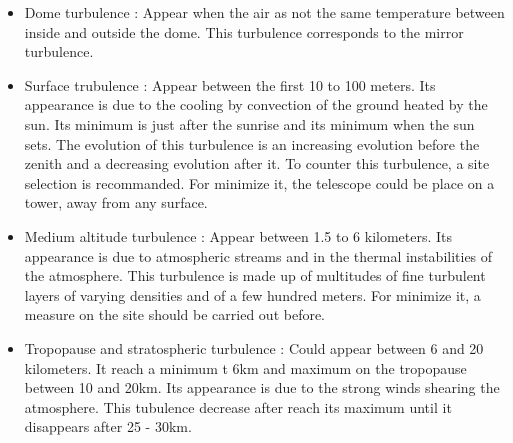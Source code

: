 \begin{itemize}
    \item Dome turbulence : \newline Appear when the air as not the same temperature between inside and outside the dome. This turbulence corresponds to
          the mirror turbulence.
    \item Surface trubulence : \newline Appear between the first 10 to 100 meters. Its appearance is due to the cooling by convection of the ground
          heated by the sun. Its minimum is just after the sunrise and its minimum when the sun sets. The evolution of this turbulence is an increasing
          evolution before the zenith and a decreasing evolution after it.\newline
          To counter this turbulence, a site selection is recommanded. For minimize it, the telescope could be place on a tower, away from any surface.
    \item Medium altitude turbulence : \newline Appear between 1.5 to 6 kilometers. Its appearance is due to atmospheric streams and in the thermal
          instabilities of the atmosphere. This turbulence is made up of multitudes of fine turbulent layers of varying densities and of a few hundred
          meters. For minimize it, a measure on the site should be carried out before.
    \item Tropopause and stratospheric turbulence : \newline Could appear between 6 and 20 kilometers. It reach a minimum t 6km and maximum on the
          tropopause between 10 and 20km. Its appearance is due to the strong winds shearing the atmosphere. This tubulence decrease after reach its maximum
          until it disappears after 25 - 30km.
\end{itemize}

